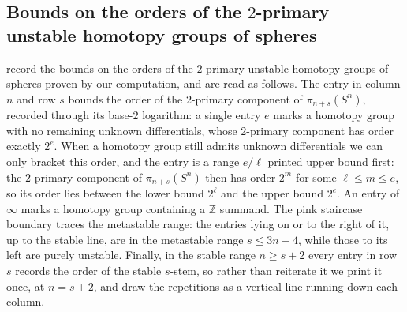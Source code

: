 \documentclass[dvipsnames,table]{amsart}
\theoremstyle{definition}
\theoremstyle{remark}
\numberwithin{equation}{section}
\begin{document}
\subsection{Bounds on the orders of the \texorpdfstring{$2$}{2}-primary unstable homotopy groups of spheres}
\label{app:bounds}
\noindent {} record the bounds on the orders of the $2$-primary unstable homotopy groups of spheres proven by our computation, and are read as follows. The entry in column $n$ and row $s$ bounds the order of the $2$-primary component of $\pi_{n+s}(S^n)$, recorded through its base-$2$ logarithm: a single entry $e$ marks a homotopy group with no remaining unknown differentials, whose $2$-primary component has order exactly $2^e$. When a homotopy group still admits unknown differentials we can only bracket this order, and the entry is a range $e/\ell$ printed upper bound first: the $2$-primary component of $\pi_{n+s}(S^n)$ then has order $2^m$ for some $\ell \leq m \leq e$, so its order lies between the lower bound $2^\ell$ and the upper bound $2^e$. An entry of $\infty$ marks a homotopy group containing a $\mathbb{Z}$ summand. The {\color{CtpPink}pink staircase boundary} traces the metastable range: the entries lying on or to the right of it, up to the stable line, are in the metastable range $s \leq 3n - 4$, while those to its left are purely unstable. Finally, in the stable range $n \geq s + 2$ every entry in row $s$ records the order of the stable $s$-stem, so rather than reiterate it we print it once, at $n = s + 2$, and draw the repetitions as a vertical line running down each column.


\clearpage
\printbibliography
\end{document}
